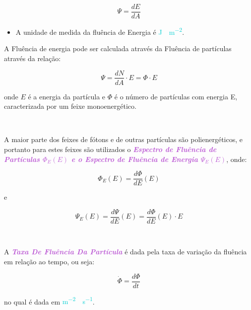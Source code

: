 \documentclass[11pt,a4paper]{article}
\newcounter{exemplo}
\begin{document}
			\begin{equation}
			\Psi = \frac{d E}{d A}
			\end{equation}


		\begin{exemplo}[Unidade]
			\begin{itemize}
				\item A unidade de medida da fluência de Energia é \textcolor{DarkTurquoise}{\unit{J \cdot m^{-2}}}.
			\end{itemize}
			
		\end{exemplo}

      	\noindent  A Fluência de energia pode ser calculada através da Fluência de partículas através da relação:

			\begin{equation}
			\Psi = \frac{d N}{d A} \cdot E = \Phi \cdot E
			\end{equation}
      
      	\noindent onde $E$ é a energia da partícula e $\Phi$ é o número de partículas com energia E, caracterizada por um feixe monoenergético. 

    	\

    	A maior parte dos feixes de fótons e de outras partículas são polienergéticos, e portanto para estes feixes são utilizados o \textit{\textbf{\textcolor{MediumOrchid}{Espectro de Fluência de Partículas $\Phi_E(E)$ e o Espectro de Fluência de Energia $\Psi_E(E)$}}}, onde:

			\begin{equation}
			\Phi_E(E) = \frac{d \Phi}{dE}(E)
			\end{equation}

      	\noindent e

			\begin{equation}
			\Psi_E(E) = \frac{d \Psi}{d E}(E) = \frac{d \Phi}{dE}(E) \cdot E 
			\end{equation}

		\

		A \textit{\textbf{\textcolor{MediumOrchid}{Taxa De Fluência Da Partícula}}} é dada pela taxa de variação da fluência em relação ao tempo, ou seja:

			\begin{equation}
				\dot{\Phi} = \frac{d \Phi}{d t}
			\end{equation}

		\noindent no qual é dada em \textcolor{DarkTurquoise}{\unit{m^{-2} \cdot s^{-1}}}.
\end{document}
